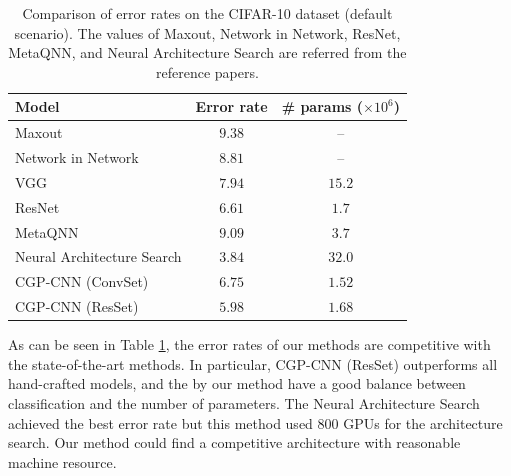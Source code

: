 \begin{table}[t]
  \caption{Comparison of error rates on the CIFAR-10 dataset (default scenario). The values of Maxout, Network in Network, ResNet, MetaQNN, and Neural Architecture Search are referred from the reference papers.}
  \label{results}
  \begin{tabular}{l|c|c} \hline
   Model & Error rate & \# params ($\times 10^6$) \\ \hline
   Maxout \cite{goodfellow_maxout_2013} & $9.38$ & -- \\ 
   Network in Network \cite{lin_network_2014} & $8.81$ & -- \\
   VGG \cite{simonyan_very_2014} \footnotemark & $7.94$ & $15.2$ \\
   ResNet \cite{he_deep_2016} & $6.61$ & $1.7$ \\
   MetaQNN \cite{baker_designing_2016} \footnotemark & $9.09$ & $3.7$ \\
   Neural Architecture Search \cite{zoph_neural_2016} & $3.84$ & $32.0$ \\
   CGP-CNN (ConvSet) & $6.75$ & $1.52$ \\
   CGP-CNN (ResSet) & $5.98$ & $1.68$ \\ \hline
  \end{tabular}
\end{table}


As can be seen in Table \ref{results}, the error rates of our methods are competitive with the state-of-the-art methods.
In particular, CGP-CNN (ResSet) outperforms all hand-crafted models, and the  by  our method have a good balance between classification  and the number of parameters. The Neural Architecture Search achieved the best error rate\new{,} but this method used 800 GPUs for the architecture search. Our method could find a competitive architecture with  reasonable machine resource.

